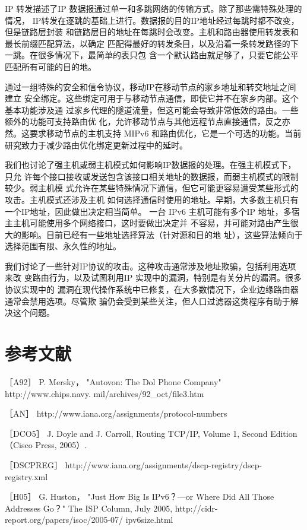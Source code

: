 IP 转发描述了IP 数据报通过单一和多跳网络的传输方式。除了那些需特殊处理的情况，
IP转发在逐跳的基础上进行。数据报的目的IP地址经过每跳时都不改变，但是链路层封装
和链路层目的地址在每跳时会改变。主机和路由器使用转发表和最长前缀匹配算法，以确定
匹配得最好的转发条目，以及沿着一条转发路径的下一跳。在很多情况下，最简单的表只包
含一个默认路由就足够了，只要它能公平匹配所有可能的目的地。

通过一组特殊的安全和信令协议，移动IP在移动节点的家乡地址和转交地址之间建立
安全绑定。这些绑定可用于与移动节点通信，即使它并不在家乡内部。这个基本功能涉及通
过家乡代理的隧道流量，但这可能会导致非常低效的路由。一些额外的功能可支持路由优
化，允许移动节点与其他远程节点直接通信，反之亦然。这要求移动节点的主机支持 MIPv6
和路由优化，它是一个可选的功能。当前研究致力于减少路由优化绑定更新过程中的延时。

我们也讨论了强主机或弱主机模式如何影响IP数据报的处理。在强主机模式下，只允
许每个接口接收或发送包含该接口相关地址的数据报，而弱主机模式的限制较少。弱主机模
式允许在某些特殊情况下通信，但它可能更容易遭受某些形式的攻击。主机模式还涉及主机
如何选择通信时使用的地址。早期，大多数主机只有一个IP地址，因此做出决定相当简单。
一台 IPv6 主机可能有多个IP 地址，多宿主主机可能使用多个网络接口，这时要做出决定并
不容易，并可能对路由产生很大的影响。目前已经有一些地址选择算法（针对源和目的地
址），这些算法倾向于选择范围有限、永久性的地址。

我们讨论了一些针对IP协议的攻击。这种攻击通常涉及地址欺骗，包括利用选项来改
变路由行为，以及试图利用IP 实现中的漏洞，特别是有关分片的漏洞。很多协议实现中的
漏洞在现代操作系统中已修复，在大多数情况下，企业边缘路由器通常会禁用选项。尽管欺
骗仍会受到某些关注，但人口过滤器这类程序有助于解决这个问题。

\section{参考文献}

［A92］ P. Mersky， "Autovon: The Dol Phone Company" http://www.chips.navy.
mil/archives/92\_oct/file3.htm

［AN］ http://www.iana.org/assignments/protocol-numbers

［DCO5］ J. Doyle and J. Carroll, Routing TCP/IP, Volume 1, Second Edition （Cisco
Press, 2005）.

［DSCPREG］ http://www.iana.org/assignments/dscp-registry/dscp-registry.xml

［H05］ G. Huston， "Just How Big Is IPv6？—or Where Did All Those Addresses
Go？" The ISP Column, July 2005, http://cidr-report.org/papers/isoc/2005-07/
ipv6size.html

